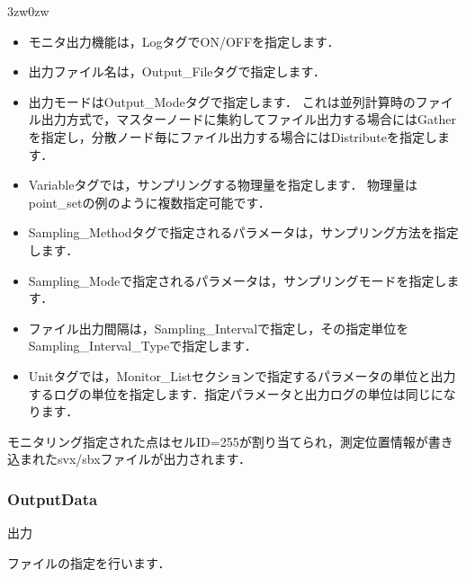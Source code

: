 \begin{indentation}{3zw}{0zw}
\begin{itemize}
\item モニタ出力機能は，LogタグでON/OFFを指定します．
\item 出力ファイル名は，Output\_Fileタグで指定します．
\item 出力モードはOutput\_Modeタグで指定します．
これは並列計算時のファイル出力方式で，マスターノードに集約してファイル出力する場合にはGatherを指定し，分散ノード毎にファイル出力する場合にはDistributeを指定します．
\item Variableタグでは，サンプリングする物理量を指定します．
物理量はpoint\_setの例のように複数指定可能です．
\item Sampling\_Methodタグで指定されるパラメータは，サンプリング方法を指定します．
\item Sampling\_Modeで指定されるパラメータは，サンプリングモードを指定します．
\item ファイル出力間隔は，Sampling\_Intervalで指定し，その指定単位をSampling\_Interval\_Typeで指定します．
\item Unitタグでは，Monitor\_Listセクションで指定するパラメータの単位と出力するログの単位を指定します．指定パラメータと出力ログの単位は同じになります．
\end{itemize}

モニタリング指定された点はセルID=255が割り当てられ，測定位置情報が書き込まれたsvx/sbxファイルが出力されます．
\end{indentation}



\pagebreak
\subsubsection{OutputData}

\hypertarget{tgt:output_data}{出力}ファイルの指定を行います．


